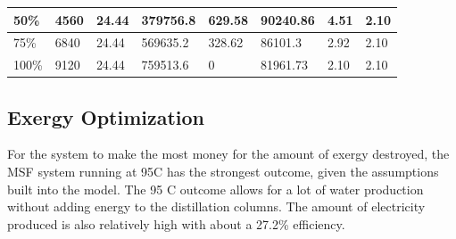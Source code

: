 \documentclass[12pt]{UIdahoMastersThesis}
\begin{document}
\begin{table}[h!]
\begin{tabular}{|l|l|l|l|l|l|l|l|}
50\%                                                                                                            &4560 &24.44                                                                                                   & 379756.8                                                                                       & 629.58                                                       & 90240.86                                                                             & 4.51               & 2.10                                                               \\ \hline
75\%                                                                                                            & 6840& 24.44                                                                                                   & 569635.2                                                                                       & 328.62                                                       & 86101.3                                                                              & 2.92               & 2.10                                                               \\ \hline
100\%                                                                                                           &9120 &24.44                                                                                                   & 759513.6                                                                                       & 0                                                            & 81961.73                                                                             & 2.10               & 2.10                                                               \\ \hline
\end{tabular}
\end{table}

\newpage

\subsection{Exergy Optimization}
For the system to make the most money for the amount of exergy destroyed, the MSF system running at 95\degree C has the strongest outcome, given the assumptions built into the model.  The 95 \degree C outcome allows for a lot of water production without adding energy to the distillation columns. The amount of electricity produced is also relatively high with about a 27.2\% efficiency.  
\end{document}
